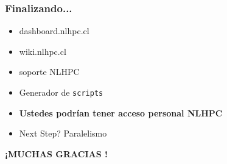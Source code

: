 \documentclass[aspectratio=169,professionalfonts]{beamer}
\begin{document}
\begin{frame}[fragile]
\frametitle{\textbf{Finalizando...}}

\begin{itemize}
    \item dashboard.nlhpc.cl
     \vspace{0.5em} 
    \item wiki.nlhpc.cl
     \vspace{0.5em} 
    \item soporte NLHPC 
     \vspace{0.5em} 
    \item Generador de \texttt{scripts}
     \vspace{0.5em} 
    \item \textbf{Ustedes podrían tener acceso personal NLHPC }
     \vspace{0.5em} 
    \item Next Step? Paralelismo
\end{itemize}
\end{frame}
    \begin{frame}
 \vspace{0.5em} 
    \textbf{¡MUCHAS GRACIAS !}
        
    \end{frame}
\end{document}

